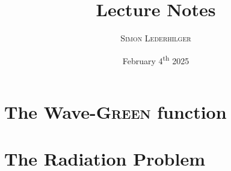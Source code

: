 \documentclass{article}
\title{Lecture Notes}
\subtitle{\textit{\headcourse}}
\author{\textsc{Simon Lederhilger}}
\date{February 4\textsuperscript{th} 2025}
\begin{document}
\maketitle\thispagestyle{fancy}
    \begin{multicols*}{2}
        \section[Green Function]{The Wave-\textsc{Green} function}
        

        \section[Radiation]{The Radiation Problem}
        

        \printbibliography
    \end{multicols*}
\end{document}
